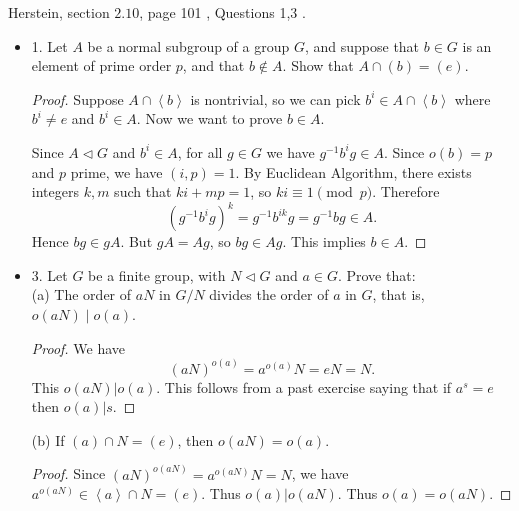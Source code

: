 
Herstein, section $2.10$, page 101 , Questions 1,3 .
\begin{itemize}
	\item 1. Let $A$ be a normal subgroup of a group $G$, and suppose that $b \in G$ is an element of prime order $p$, and that $b \notin A$. Show that $A \cap(b)=(e)$.
\begin{proof}
	Suppose $A \cap \left\langle b \right\rangle $ is nontrivial, so we can pick $b^i \in A \cap \left\langle b \right\rangle $ where $b^i \neq  e$ and $b^i \in A$. Now we want to prove $b \in A$.

	Since $A \triangleleft G$ and $b^i \in A$, for all $g \in G$ we have $g^{-1} b^i g \in A$. Since $o(b) = p$ and $p$ prime, we have $(i, p) = 1$. By Euclidean Algorithm, there exists integers $k, m$ such that $ki + mp = 1$, so $ki \equiv 1 \pmod p$. Therefore
	\[
		\left( g^{-1} b^i g \right)^k =  g^{-1} b^{ik} g = g^{-1} bg \in A
	.\] 
	Hence $bg \in  gA$. But $gA = Ag$, so $bg \in Ag$. This implies $b \in A$.
\end{proof}
\item
3. Let $G$ be a finite group, with $N \triangleleft G$ and $a \in G$. Prove that:\\
(a) The order of $a N$ in $G / N$ divides the order of $a$ in $G$, that is, $o(a N) \mid o(a)$.
\begin{proof}
	We have
	\[
		(aN)^{o(a)} = a^{o(a)}N = eN = N
	.\] 
	This $o(aN) | o(a)$. This follows from a past exercise saying that if $a^s = e$ then $o(a) | s$.
\end{proof}

(b) If $(a) \cap N=(e)$, then $o(a N)=o(a)$.
\begin{proof}
	Since $(aN)^{o(aN)} = a^{o(aN)} N= N$, we have $a^{o(aN)} \in \left\langle a \right\rangle \cap N = (e)$. Thus $o(a) | o(aN)$. Thus $o(a) = o(aN)$.
	

\end{proof}
\end{itemize}

